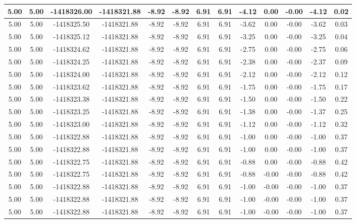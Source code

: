 \begin{table}[htbp]
\begin{adjustbox}{angle=90}
\begin{tabular}{|c|c|c|c|c|c|c|c|c|c|c|c|c|}
 5.00 & 5.00 & -1418326.00 & -1418321.88 & -8.92 & -8.92 & 6.91 & 6.91 & -4.12 & 0.00 & -0.00 & -4.12 & 0.02\\ \hline
 5.00 & 5.00 & -1418325.50 & -1418321.88 & -8.92 & -8.92 & 6.91 & 6.91 & -3.62 & 0.00 & -0.00 & -3.62 & 0.03\\ \hline
 5.00 & 5.00 & -1418325.12 & -1418321.88 & -8.92 & -8.92 & 6.91 & 6.91 & -3.25 & 0.00 & -0.00 & -3.25 & 0.04\\ \hline
 5.00 & 5.00 & -1418324.62 & -1418321.88 & -8.92 & -8.92 & 6.91 & 6.91 & -2.75 & 0.00 & -0.00 & -2.75 & 0.06\\ \hline
 5.00 & 5.00 & -1418324.25 & -1418321.88 & -8.92 & -8.92 & 6.91 & 6.91 & -2.38 & 0.00 & -0.00 & -2.37 & 0.09\\ \hline
 5.00 & 5.00 & -1418324.00 & -1418321.88 & -8.92 & -8.92 & 6.91 & 6.91 & -2.12 & 0.00 & -0.00 & -2.12 & 0.12\\ \hline
 5.00 & 5.00 & -1418323.62 & -1418321.88 & -8.92 & -8.92 & 6.91 & 6.91 & -1.75 & 0.00 & -0.00 & -1.75 & 0.17\\ \hline
 5.00 & 5.00 & -1418323.38 & -1418321.88 & -8.92 & -8.92 & 6.91 & 6.91 & -1.50 & 0.00 & -0.00 & -1.50 & 0.22\\ \hline
 5.00 & 5.00 & -1418323.25 & -1418321.88 & -8.92 & -8.92 & 6.91 & 6.91 & -1.38 & 0.00 & -0.00 & -1.37 & 0.25\\ \hline
 5.00 & 5.00 & -1418323.00 & -1418321.88 & -8.92 & -8.92 & 6.91 & 6.91 & -1.12 & 0.00 & -0.00 & -1.12 & 0.32\\ \hline
 5.00 & 5.00 & -1418322.88 & -1418321.88 & -8.92 & -8.92 & 6.91 & 6.91 & -1.00 & 0.00 & -0.00 & -1.00 & 0.37\\ \hline
 5.00 & 5.00 & -1418322.88 & -1418321.88 & -8.92 & -8.92 & 6.91 & 6.91 & -1.00 & 0.00 & -0.00 & -1.00 & 0.37\\ \hline
 5.00 & 5.00 & -1418322.75 & -1418321.88 & -8.92 & -8.92 & 6.91 & 6.91 & -0.88 & 0.00 & -0.00 & -0.88 & 0.42\\ \hline
 5.00 & 5.00 & -1418322.75 & -1418321.88 & -8.92 & -8.92 & 6.91 & 6.91 & -0.88 & -0.00 & -0.00 & -0.88 & 0.42\\ \hline
 5.00 & 5.00 & -1418322.88 & -1418321.88 & -8.92 & -8.92 & 6.91 & 6.91 & -1.00 & -0.00 & -0.00 & -1.00 & 0.37\\ \hline
 5.00 & 5.00 & -1418322.88 & -1418321.88 & -8.92 & -8.92 & 6.91 & 6.91 & -1.00 & -0.00 & -0.00 & -1.00 & 0.37\\ \hline
 5.00 & 5.00 & -1418322.88 & -1418321.88 & -8.92 & -8.92 & 6.91 & 6.91 & -1.00 & -0.00 & -0.00 & -1.00 & 0.37\\ \hline

\end{tabular}
\end{adjustbox}
\end{table}
